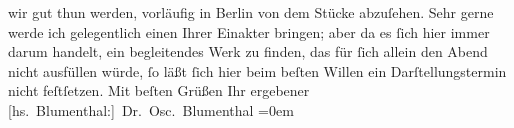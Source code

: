 \begin{ledgroupsized}[t]{13cm}
               wir gut thun werden, vorläufig in Berlin von dem Stücke abzuſehen. Sehr gerne werde
               ich gelegentlich einen Ihrer Einakter bringen; aber da es ſich hier immer darum
               handelt, ein begleitendes Werk zu finden, das für ſich allein den Abend nicht
               ausfüllen würde, ſo läßt ſich hier beim beſten Willen ein Darſtellungstermin nicht
               feſtſetzen.\pend
           \pstart
           Mit beſten Grüßen Ihr ergebener{\\[\baselineskip]}\spacefill\mbox{{[}hs. Blumenthal:{]} Dr. Osc. Blumenthal}\pend
           \leftskip=0em{}\endnumbering{}\end{ledgroupsized}  \newcommand{\dateiname}{L00292}\newcommand{\titel}{Oscar Blumenthal an Arthur Schnitzler, 16. 1. 1894}\newcommand{\editorInnen}{Martin Anton Müller und Gerd-Hermann Susen}
            \footnotesize
\begin{ledgroupsized}[t]{11.5cm}
\end{ledgroupsized}
         
      